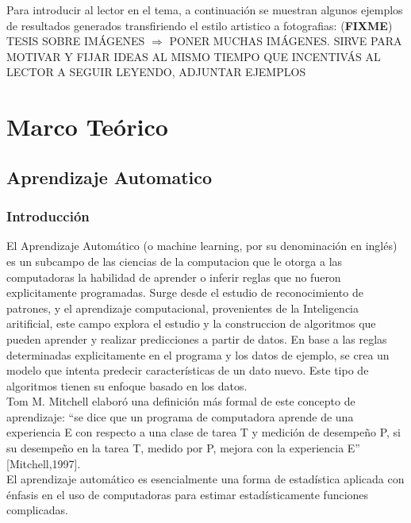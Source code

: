 \documentclass[a4paper,11pt,spanish]{book}
\newcommand*{\FIXME}[1]{{(\textbf{FIXME}) {#1}}}
\begin{document}
Para introducir al lector en el tema, a continuación se muestran algunos ejemplos de resultados generados transfiriendo el estilo artistico a fotografias:
\FIXME{TESIS SOBRE IMÁGENES $\Rightarrow$ PONER MUCHAS IMÁGENES. SIRVE PARA MOTIVAR Y FIJAR IDEAS AL MISMO TIEMPO QUE INCENTIVÁS AL LECTOR A SEGUIR LEYENDO, ADJUNTAR EJEMPLOS}



\chapter{Marco Teórico}




  \section{Aprendizaje Automatico}
    \subsection{Introducción}
      El Aprendizaje Automático (o machine learning, por su denominación en inglés) es un subcampo de las ciencias de la computacion que le otorga a las computadoras la habilidad de aprender o inferir reglas que no fueron explicitamente programadas.
      Surge desde el estudio de reconocimiento de patrones, y el aprendizaje computacional, provenientes de la Inteligencia aritificial, este campo explora el estudio y la construccion de algoritmos
      que pueden aprender y realizar predicciones a partir de datos. En base a las reglas determinadas explicitamente en el programa y los datos de ejemplo, se crea un modelo que intenta predecir
      características de un dato nuevo. Este tipo de algoritmos tienen su enfoque basado en los datos.\\
      Tom M. Mitchell elaboró una definición más formal de este concepto de aprendizaje: “se dice que un programa de computadora aprende de una experiencia E con respecto a una clase 
      de tarea T y medición de desempeño P, si su desempeño en la tarea T, medido por P, mejora con la experiencia E” [Mitchell,1997].\\
      El aprendizaje automático es esencialmente una forma de estadística aplicada con énfasis en el uso de computadoras para estimar estadísticamente funciones complicadas.
\end{document}
